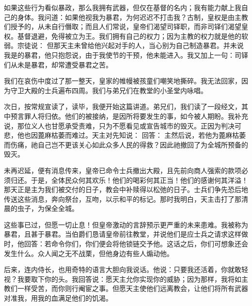如果这些行为看似暴政，那么我拥有武器，但仅在基督的名内；我有能力献上我自己的身体。我问道：如果他视我为暴君，为何迟迟不打击我？古制，皇权是由主教们授予的，从未自行僭取；而且人们常说，皇帝们渴望司铎职，而非司铎们渴望皇权。基督退避，免得被立为王。我们拥有自己的权力；因为主教的权力就是他的软弱。宗徒说： 但那天主未曾给他兴起对手的人，当心别为自己制造暴君。并未说我是的暴君，他只抱怨说，由于我使节的干预，他未能进入。我又加上一句：司铎们从未是暴君，却常遭受暴君之苦。\par

我们在哀伤中度过了那一整天，皇家的帷幔被孩童们嘲笑地撕碎。我无法回家，因为守卫大殿的士兵遍布四周。我们与弟兄们在教堂的小圣堂内咏唱。\par

次日，按常规宣读了，读毕，我便开始这篇讲道。弟兄们，我们读了一段经文，其中预言罪人将归依。他们的被接纳，是因所将要发生的事，如今被人期盼。我补充说，那位义人也甘愿承受责难，只为不愿看见或宣告城市的毁灭。正因为判决可悲，他也因蓖麻枯萎而难过。天主对先知说： 回答： 主然后说，若他为蓖麻枯萎而伤痛，祂自己岂不更该关心如此众多人民的得救？因此祂撤回了为全城所预备的毁灭。\par

未再迟延，便有消息传来，皇帝已命令士兵撤出大殿，且先前向商人强索的款项必须归还。于是，全体民众何其欢乐！他们的喝彩何其正当！他们的感谢何其洋溢！那天正是主为我们被交付的日子，教会中补赎得以松弛的日子。士兵们争先恐后地传送这些消息，奔向祭台，互吻，以示和平的标记。那时我明白，天主击打了那清晨的虫子，为保全全城。\par

这些事已过，但愿一切止息！但皇帝激动的言辞预示更严重的未来患难。我被称为暴君，且甚于暴君。当伯爵们恳请皇帝前往教堂，并说他们是应士兵之请求这样做时，他回答：若命令你们，你们便会将他锁链交予他。这话之后，你们可想象还会发生什么。众人闻之无不战栗，但他身边有些人煽动他。\par

后来，连内侍长，也用奇特的语言大胆向我说话。他说：只要我还活着，你就敢轻视？我要取下你的头。我回答说：愿天主允你实现你的威胁；因为那样，我将如主教们一样受苦，而你则行阉宦之事。但愿天主使他们远离教会，让他们将所有武器对准我，用我的血满足他们的饥渴。\par



